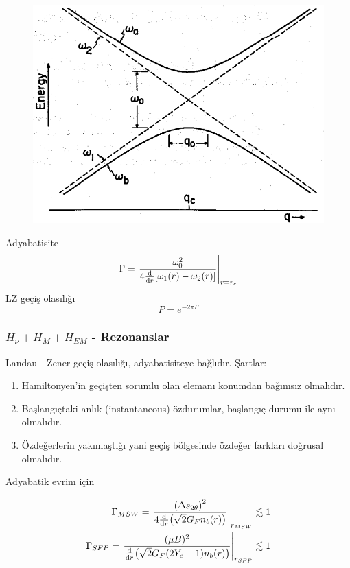 \documentclass[10pt]{beamer}
\begin{document}
\begin{frame}
    \begin{minipage}{0.45\textwidth}
    \begin{figure}[hbt!]
        \centering
        \includegraphics[width=.9\textwidth]{fig/Avoid_Crossing_With_Paramters.png}
    \end{figure}
    \end{minipage}
    \hfill
    \begin{minipage}{0.45\textwidth}
        Adyabatisite
        \begin{equation*}
            \Gamma = \eval{\frac{\omega^{2}_{0}}{4 \dv{r} \qty[\omega_{1}(r)-\omega_{2}(r)]}}_{r=r_{c}}
        \end{equation*}
        LZ geçiş olasılığı
        \begin{equation*}
            P = e^{-2\pi \Gamma}
        \end{equation*}
    \end{minipage}
\end{frame}

\begin{frame}
    \frametitle{$H_{\nu}+ H_{M}+ H_{EM}$ - Rezonanslar}
    Landau - Zener geçiş olasılığı, adyabatisiteye bağlıdır. Şartlar:
    \scriptsize
    \begin{enumerate}
        \item Hamiltonyen'in geçişten sorumlu olan elemanı konumdan bağımsız olmalıdır.
        \item Başlangıçtaki anlık (instantaneous) özdurumlar, başlangıç durumu ile aynı olmalıdır.
        \item Özdeğerlerin yakınlaştığı yani geçiş bölgesinde özdeğer farkları doğrusal olmalıdır.
    \end{enumerate}
    \normalsize

    \hrulefill
    
    Adyabatik evrim için 

    \begin{align*}
        \Gamma_{MSW} = \eval{\frac{\qty(\Delta s_{2\theta})^{2}}{4\dv{r}(\sqrt{2}G_{F}n_{b}(r)) }}_{r_{MSW}} \lesssim 1 \\
        \Gamma_{SFP} = \eval{\frac{(\mu B)^{2}}{\dv{r}(\sqrt{2}G_{F}(2Y_{e}-1)n_{b}(r))} }_{r_{SFP}}\lesssim 1
    \end{align*}

\end{frame}
\end{document}
